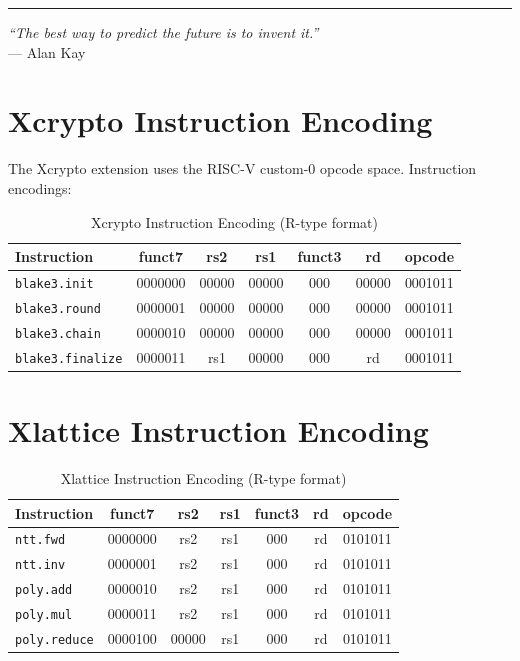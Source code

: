 \documentclass[11pt,a4paper]{article}
\begin{document}
\vspace{1cm}
\hrule
\vspace{0.5cm}
\begin{center}
\textit{``The best way to predict the future is to invent it.''}\\
--- Alan Kay
\end{center}

\appendix
\section{Xcrypto Instruction Encoding}
\label{app:xcrypto}

The Xcrypto extension uses the RISC-V custom-0 opcode space. Instruction encodings:

\begin{table}[H]
\centering
\caption{Xcrypto Instruction Encoding (R-type format)}
\small
\begin{tabular}{@{}lcccccc@{}}
\toprule
\textbf{Instruction} & \textbf{funct7} & \textbf{rs2} & \textbf{rs1} & \textbf{funct3} & \textbf{rd} & \textbf{opcode} \\
\midrule
\texttt{blake3.init} & 0000000 & 00000 & 00000 & 000 & 00000 & 0001011 \\
\texttt{blake3.round} & 0000001 & 00000 & 00000 & 000 & 00000 & 0001011 \\
\texttt{blake3.chain} & 0000010 & 00000 & 00000 & 000 & 00000 & 0001011 \\
\texttt{blake3.finalize} & 0000011 & rs1 & 00000 & 000 & rd & 0001011 \\
\bottomrule
\end{tabular}
\end{table}

\section{Xlattice Instruction Encoding}
\label{app:xlattice}

\begin{table}[H]
\centering
\caption{Xlattice Instruction Encoding (R-type format)}
\small
\begin{tabular}{@{}lcccccc@{}}
\toprule
\textbf{Instruction} & \textbf{funct7} & \textbf{rs2} & \textbf{rs1} & \textbf{funct3} & \textbf{rd} & \textbf{opcode} \\
\midrule
\texttt{ntt.fwd} & 0000000 & rs2 & rs1 & 000 & rd & 0101011 \\
\texttt{ntt.inv} & 0000001 & rs2 & rs1 & 000 & rd & 0101011 \\
\texttt{poly.add} & 0000010 & rs2 & rs1 & 000 & rd & 0101011 \\
\texttt{poly.mul} & 0000011 & rs2 & rs1 & 000 & rd & 0101011 \\
\texttt{poly.reduce} & 0000100 & 00000 & rs1 & 000 & rd & 0101011 \\
\bottomrule
\end{tabular}
\end{table}
\end{document}
